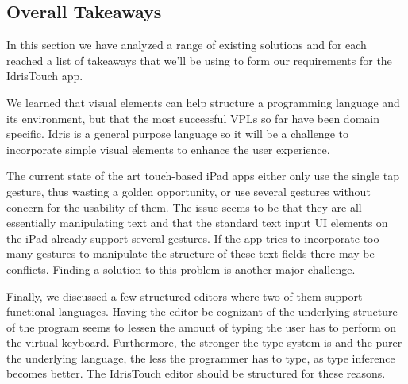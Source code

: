 \subsection{Overall Takeaways}
In this section we have analyzed a range of existing solutions and for each reached a list of takeaways that we'll be using to form our requirements for the IdrisTouch app.

We learned that visual elements can help structure a programming language and its environment, but that the most successful VPLs so far have been domain specific. Idris is a general purpose language so it will be a challenge to incorporate simple visual elements to enhance the user experience.

The current state of the art touch-based iPad apps either only use the single tap gesture, thus wasting a golden opportunity, or use several gestures without concern for the usability of them. The issue seems to be that they are all essentially manipulating text and that the standard text input UI elements on the iPad already support several gestures. If the app tries to incorporate too many gestures to manipulate the structure of these text fields there may be conflicts. Finding a solution to this problem is another major challenge.

Finally, we discussed a few structured editors where two of them support functional languages. Having the editor be cognizant of the underlying structure of the program seems to lessen the amount of typing the user has to perform on the virtual keyboard. Furthermore, the stronger the type system is and the purer the underlying language, the less the programmer has to type, as type inference becomes better. The IdrisTouch editor should be structured for these reasons.

